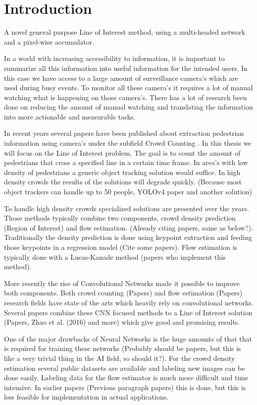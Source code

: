 \chapter{Introduction}
A novel general purpose Line of Interest method, using a multi-headed network and a pixel-wise accumulator.

In a world with increasing accessibility to information, it is important to summarize all this information into useful information for the intended users. In this case we have access to a large amount of surveillance camera's which are used during busy events. To monitor all these camera's it requires a lot of manual watching what is happening on those camera's. There has a lot of research been done on reducing the amount of manual watching and translating the information into more actionable and measurable tasks.

In recent years several papers have been published about extraction pedestrian information using camera's under the subfield Crowd Counting \cite{Chan2008, leibe_crossing-line_2016, wang2020nwpu, li2018csrnet, Fang2019, Liu2019}. In this thesis we will focus on the Line of Interest problem. The goal is to count the amount of pedestrians that cross a specified line in a certain time frame. In area's with low density of pedestrians a generic object tracking solution would suffice. In high density crowds the results of the solutions will degrade quickly. (Because most object trackers can handle up to 50 people, YOLOv4 paper and another solution)

To handle high density crowds specialized solutions are presented over the years. Those methods typically combine two components, crowd density prediction (Region of Interest) and flow estimation. (Already citing papers, same as below?). Traditionally the density prediction is done using keypoint extraction and feeding those keypoints in a regression model (Cite some papers). Flow estimation is typically done with a Lucas-Kanade method (papers who implement this method).

More recently the rise of Convolutional Networks made it possible to improve both components. Both crowd counting (Papers) and flow estimation (Papers) research fields have state of the arts which heavily rely on convolutional networks. Several papers combine these CNN focused methods to a Line of Interest solution (Papers, Zhao et al. (2016) and more) which give good and promising results.

One of the major drawbacks of Neural Networks is the huge amounts of that that is required for training these networks (Probably should be papers, but this is like a very trivial thing in the AI field, so should it?). For the crowd density estimation several public datasets are available and labeling new images can be done easily. Labeling data for the flow estimator is much more difficult and time intensive.  In earlier papers (Previous paragraph papers) this is done, but this is less feasible for implementation in actual applications.

